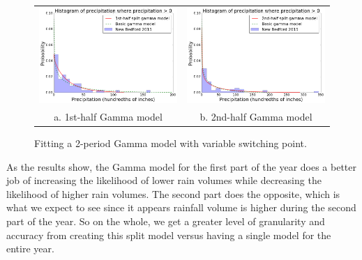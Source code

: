\documentclass{article}
\begin{document}
\begin{figure}
\centering
\begin{tabular}{cc}
\includegraphics[scale=0.35]{../images/split_gamma_res_1.png} & \includegraphics[scale=0.35]{../images/split_gamma_res_2.png} \\
a. 1st-half Gamma model & b. 2nd-half Gamma model
\end{tabular}
\caption{Fitting a 2-period Gamma model with variable switching point.}
\label{fig:split_gamma_res}
\end{figure}

As the results show, the Gamma model for the first part of the year does a better job of increasing the likelihood of lower rain volumes while decreasing the likelihood of higher rain volumes. The second part does the opposite, which is what we expect to see since it appears rainfall volume is higher during the second part of the year. So on the whole, we get a greater level of granularity and accuracy from creating this split model versus having a single model for the entire year.
\end{document}

